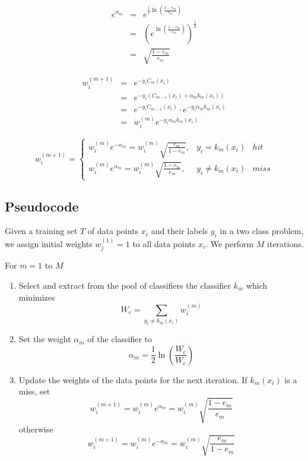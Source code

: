 \documentclass[]{article}  %
\begin{document}
\begin{eqnarray*}
e^{\alpha_m} &=& e^{\frac{1}{2} \ln \left(\frac{1-e_m}{e_m}\right)}\\
&=& (e^{\ln \left(\frac{1-e_m}{e_m}\right)})^{\frac{1}{2}}\\
&=& \sqrt{\frac{1-e_m}{e_m}}
\end{eqnarray*}

\begin{eqnarray*}
w_i^{(m+1)} &=& e^{-y_i C_m(x_i)}\\
&=& e^{-y_i (C_{m-1}(x_i) + \alpha_m k_m(x_i))}\\
&=& e^{-y_i C_{m-1}(x_i)} \cdot e^{-y_i \alpha_m k_m(x_i)}\\
&=& w_i^{(m)} e^{-y_i \alpha_m k_m(x_i)}
\end{eqnarray*}

\begin{equation}\label{weight-update}
w_i^{(m+1)}=\left\{
\begin{array}{ccc}
w_i^{(m)} e^ {-\alpha_m}=w_i^{(m)}\sqrt{\frac{e_m}{1-e_m}} ,  & y_i = k_m(x_i) & hit\\
w_i^{(m)} e^{\alpha_m}=w_i^{(m)}\sqrt{\frac{1-e_m}{e_m}}, & y_i \neq k_m(x_i) & miss
\end{array} \right.
\end{equation}

\subsection{Pseudocode}
Given a training set $T$ of data points $x_i$ and their labels $y_i$ in a two class problem, we assign initial weights $w_j^{(1)}=1$ to all data points $x_i$. We perform $M$ iterations.

For $m=1$ to $M$
\begin{enumerate}

\item Select and extract from the pool of classifiers the classifier $k_m$ which minimizes 
\[
W_e = \sum _{y_i\neq k_m(x_i)}w_i^{(m)}
\]
\item Set the weight $\alpha_m$ of the classifier to 
\[
\alpha_m = \frac{1}{2} \ln \left(\frac{W_c}{W_e}\right) 
\]

\item Update the weights of the data points for the next iteration. If $k_m(x_i)$ is a miss, set
\[
w_i^{(m+1)} = w_i^{(m)} e^{\alpha_m}=w_i^{(m)}\sqrt{\frac{1-e_m}{e_m}} 
\]
otherwise 
\[
w_i^{(m+1)} =w_i^{(m)} e^ {-\alpha_m}=w_i^{(m)}\sqrt{\frac{e_m}{1-e_m}}
\]
\end{enumerate}
\end{document}

